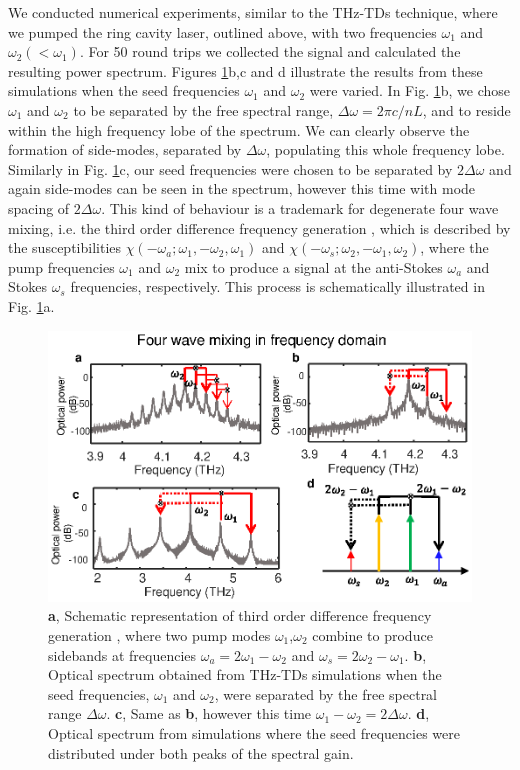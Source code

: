 \documentclass[twocolumn,secnumarabic,amssymb, nobibnotes, aps, prd]{revtex4-1}
\begin{document}
{			We conducted numerical experiments, similar to the THz-TDs technique, where we pumped the ring cavity laser, outlined above, with two frequencies $\omega_1$ and $\omega_2 (< \omega_1)$. For 50 round trips we collected the signal and calculated the resulting power spectrum. Figures \ref{fig:img04}b,c and d illustrate the results from these simulations when the seed frequencies $\omega_1$ and $\omega_2$ were varied. In Fig. \ref{fig:img04}b, we chose $\omega_1$ and $\omega_2$ to be separated by the free spectral range, $\Delta\omega = 2\pi c/nL$, and to reside within the high frequency lobe of the spectrum. We can clearly observe the formation of side-modes, separated by $\Delta \omega$, populating this whole frequency lobe. Similarly in Fig. \ref{fig:img04}c, our seed frequencies were chosen to be separated by $2\Delta \omega$ and again side-modes can be seen in the spectrum, however this time with mode spacing of $2\Delta \omega$. This kind of behaviour is a trademark for degenerate four wave mixing, i.e. the third order difference frequency generation \cite{butcher1991elements}, which is described by the susceptibilities $\chi(-\omega_a; \omega_1,-\omega_2,\omega_1)$  and $\chi(-\omega_s; \omega_2,-\omega_1,\omega_2)$, where the pump frequencies $\omega_1$ and $\omega_2$ mix to produce a signal at the anti-Stokes $\omega_a$ and Stokes $\omega_s$ frequencies, respectively. This process is schematically illustrated in Fig. \ref{fig:img04}a.
			
			\begin{figure}[h!]
				\begin{center}
					\includegraphics[scale=0.8]{figs/FWM.eps}
					\caption{\textbf{a}, Schematic representation of third order difference frequency generation \cite{butcher1991elements}, where two pump modes $\omega_1$,$\omega_2$ combine to produce sidebands at frequencies $\omega_a = 2\omega_1-\omega_2$ and $\omega_s=2\omega_2-\omega_1$. \textbf{b}, Optical spectrum obtained from THz-TDs simulations when the seed frequencies, $\omega_1$ and $\omega_2$, were separated by the free spectral range $\Delta \omega$. \textbf{c}, Same as \textbf{b}, however this time $\omega_1-\omega_2 = 2\Delta \omega$. \textbf{d}, Optical spectrum from simulations where the seed frequencies were distributed under both peaks of the spectral gain.} \label{fig:img04} 
				\end{center}	
			\end{figure}
			
}
\end{document}
